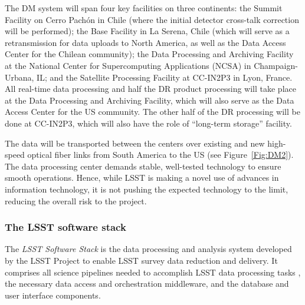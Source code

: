 The DM system will span four key facilities on three continents: the Summit
Facility on Cerro Pach\'on in Chile (where the initial detector cross-talk correction
will be performed); the Base Facility in La Serena, Chile (which will serve as a retransmission
for data uploads to North America, as well as the Data Access Center for the Chilean community);
the Data Processing and Archiving Facility at the National Center for Supercomputing Applications
(NCSA) in Champaign-Urbana, IL; and the Satellite Processing Facility at CC-IN2P3 in Lyon, France.
All real-time data processing and half the DR product processing will take place at the
Data Processing and Archiving Facility, which will also serve as the Data Access Center for the US
community. The other half of the DR processing will be done at CC-IN2P3, which
will also have the role of ``long-term storage'' facility.

The data will be transported between the centers over existing and new high-speed optical fiber
links from South America to the US (see Figure~\ref{Fig:DM2}). The data processing center demands
stable, well-tested technology to ensure smooth operations. Hence, while LSST is making a novel
use of advances in information technology, it is not pushing the expected technology to the limit,
reducing the overall risk to the project.

\subsubsection{The LSST software stack}
\label{sec:dmstack}

The \emph{LSST Software Stack} is the data processing and analysis
system developed by the LSST Project to enable LSST survey data
reduction and delivery. It comprises
all science pipelines needed to accomplish LSST data processing tasks
\citep[e.g., calibration, single-frame processing, co-addition, image
differencing, multi-epoch measurement, and asteroid orbit determination; see ][for an overview]{2018arXiv181203248B},
the necessary data access \citep[e.g.,][]{adassxxviii_P7-14} and orchestration middleware, and the database and user
interface components.


